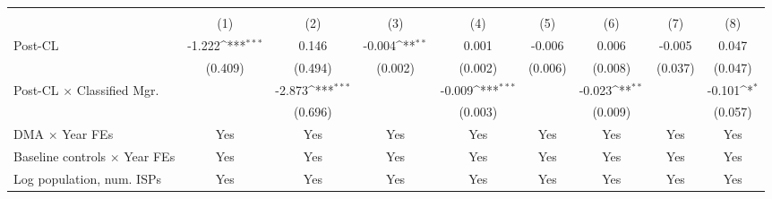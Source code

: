 {
\def\sym#1{\ifmmode^{#1}\else\(^{#1}\)\fi}
\begin{tabular}{l*{8}{c}}
\toprule
                    &&&&\\\cmidrule(lr){2-3}\cmidrule(lr){4-5}\cmidrule(lr){6-7}\cmidrule(lr){8-9}
                    &         &         &         &         &         &         &         &         \\
\midrule
Post-CL             &      -1.222\sym{***}&       0.146         &      -0.004\sym{**} &       0.001         &      -0.006         &       0.006         &      -0.005         &       0.047         \\
                    &     (0.409)         &     (0.494)         &     (0.002)         &     (0.002)         &     (0.006)         &     (0.008)         &     (0.037)         &     (0.047)         \\
\addlinespace
Post-CL $\times$ Classified Mgr.&                     &      -2.873\sym{***}&                     &      -0.009\sym{***}&                     &      -0.023\sym{**} &                     &      -0.101\sym{*}  \\
                    &                     &     (0.696)         &                     &     (0.003)         &                     &     (0.009)         &                     &     (0.057)         \\
\addlinespace
DMA $\times$ Year FEs &         Yes         &         Yes         &         Yes         &         Yes         &         Yes         &         Yes         &         Yes         &         Yes         \\
\addlinespace
Baseline controls $\times$ Year FEs &         Yes         &         Yes         &         Yes         &         Yes         &         Yes         &         Yes         &         Yes         &         Yes         \\
\addlinespace
Log population, num. ISPs &         Yes         &         Yes         &         Yes         &         Yes         &         Yes         &         Yes         &         Yes         &         Yes         \\

\end{tabular}}
